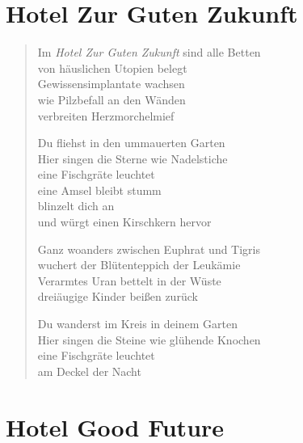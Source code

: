 
\cleartoverso

\section{Hotel Zur Guten Zukunft}

\begin{verse}
Im \emph{Hotel Zur Guten Zukunft} sind alle Betten\\
von häuslichen Utopien belegt\\
Gewissensimplantate wachsen\\
wie Pilzbefall an den Wänden\\
verbreiten Herzmorchelmief

Du fliehst in den ummauerten Garten\\
Hier singen die Sterne wie Nadelstiche\\
eine Fischgräte leuchtet\\
eine Amsel bleibt stumm\\
blinzelt dich an\\
und würgt einen Kirschkern hervor

Ganz woanders zwischen Euphrat und Tigris\\
wuchert der Blütenteppich der Leukämie\\
Verarmtes Uran bettelt in der Wüste\\
dreiäugige Kinder beißen zurück

Du wanderst im Kreis in deinem Garten\\
Hier singen die Steine wie glühende Knochen\\
eine Fischgräte leuchtet\\
am Deckel der Nacht
\end{verse}

\cleartorecto

\section{Hotel Good Future}


